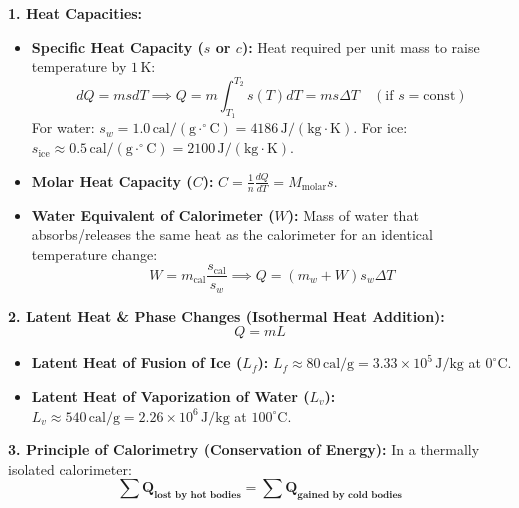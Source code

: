 \documentclass[10pt,twoside,openright]{book}
\begin{document}
\begin{formulabox}
\textbf{1. Heat Capacities:}
\begin{itemize}
  \item \textbf{Specific Heat Capacity ($s$ or $c$):} Heat required per unit mass to raise temperature by $1\,\mathrm{K}$:
  \begin{equation}
    dQ = m s dT \implies Q = m \int_{T_1}^{T_2} s(T) dT = m s \Delta T \quad (\text{if } s = \text{const})
  \end{equation}
  For water: $s_w = 1.0\,\mathrm{cal}/(\mathrm{g}\cdot^\circ\mathrm{C}) = 4186\,\mathrm{J}/(\mathrm{kg}\cdot\mathrm{K})$. For ice: $s_{\text{ice}} \approx 0.5\,\mathrm{cal}/(\mathrm{g}\cdot^\circ\mathrm{C}) = 2100\,\mathrm{J}/(\mathrm{kg}\cdot\mathrm{K})$.
  \item \textbf{Molar Heat Capacity ($C$):} $C = \frac{1}{n}\frac{dQ}{dT} = M_{\text{molar}} s$.
  \item \textbf{Water Equivalent of Calorimeter ($W$):} Mass of water that absorbs/releases the same heat as the calorimeter for an identical temperature change:
  \begin{equation}
    W = m_{\text{cal}} \frac{s_{\text{cal}}}{s_w} \implies Q = (m_w + W) s_w \Delta T
  \end{equation}
\end{itemize}
\textbf{2. Latent Heat \& Phase Changes (Isothermal Heat Addition):}
\begin{equation}
  Q = m L
\end{equation}
\begin{itemize}
  \item \textbf{Latent Heat of Fusion of Ice ($L_f$):} $L_f \approx 80\,\mathrm{cal}/\mathrm{g} = 3.33 \times 10^5\,\mathrm{J}/\mathrm{kg}$ at $0^\circ\mathrm{C}$.
  \item \textbf{Latent Heat of Vaporization of Water ($L_v$):} $L_v \approx 540\,\mathrm{cal}/\mathrm{g} = 2.26 \times 10^6\,\mathrm{J}/\mathrm{kg}$ at $100^\circ\mathrm{C}$.
\end{itemize}
\textbf{3. Principle of Calorimetry (Conservation of Energy):}
In a thermally isolated calorimeter:
\begin{equation}
  \mathbf{\sum Q_{\text{lost by hot bodies}} = \sum Q_{\text{gained by cold bodies}}}
\end{equation}
\end{formulabox}
\end{document}
